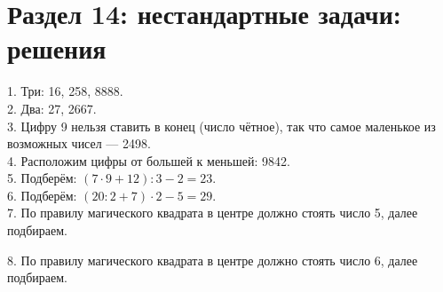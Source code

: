 \documentclass[12pt]{article}
\begin{document}
\section{Раздел 14: нестандартные задачи: решения}
1. Три: 16, 258, 8888.\\
2. Два: 27, 2667.\\
3. Цифру 9 нельзя ставить в конец (число чётное), так что самое маленькое из возможных чисел --- 2498.\\
4. Расположим цифры от большей к меньшей: 9842.\\
5. Подберём: $(7\cdot9+12):3-2=23.$\\
6. Подберём: $(20:2+7)\cdot2-5=29.$\\
7. По правилу магического квадрата в центре должно стоять число 5, далее подбираем.
\begin{center}
\begin{figure}[h!]
\end{figure}
\end{center}
8. По правилу магического квадрата в центре должно стоять число 6, далее подбираем.
\begin{center}
\begin{figure}[h!]
\end{figure}
\end{center}
\end{document}
